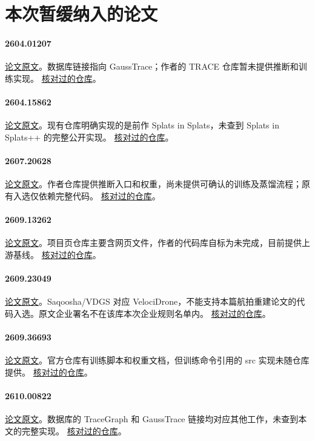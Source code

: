 \section*{本次暂缓纳入的论文}

\paragraph{2604.01207} \href{https://arxiv.org/html/2604.01207}{论文原文}。数据库链接指向 GaussTrace；作者的 TRACE 仓库暂未提供推断和训练实现。 \href{https://github.com/little612pea/Trace}{核对过的仓库}。

\paragraph{2604.15862} \href{https://arxiv.org/html/2604.15862}{论文原文}。现有仓库明确实现的是前作 Splats in Splats，未查到 Splats in Splats++ 的完整公开实现。 \href{https://github.com/insightlab-CG-3DV/splats-in-splats}{核对过的仓库}。

\paragraph{2607.20628} \href{https://arxiv.org/abs/2607.20628}{论文原文}。作者仓库提供推断入口和权重，尚未提供可确认的训练及蒸馏流程；原有入选仅依赖完整代码。 \href{https://github.com/openimaginglab/RealVDeblur}{核对过的仓库}。

\paragraph{2609.13262} \href{https://arxiv.org/html/2609.13262v1}{论文原文}。项目页仓库主要含网页文件，作者的代码库自标为未完成，目前提供上游基线。 \href{https://github.com/vulab-ai/filling-the-unseen-code}{核对过的仓库}。

\paragraph{2609.23049} \href{https://arxiv.org/abs/2609.23049}{论文原文}。Saqoosha/VDGS 对应 VelociDrone，不能支持本篇航拍重建论文的代码入选。原文企业署名不在该库本次企业规则名单内。 \href{https://github.com/saqoosha/vdgs}{核对过的仓库}。

\paragraph{2609.36693} \href{https://arxiv.org/abs/2609.36693}{论文原文}。官方仓库有训练脚本和权重文档，但训练命令引用的 src 实现未随仓库提供。 \href{https://github.com/aesplat/AESplat}{核对过的仓库}。

\paragraph{2610.00822} \href{https://arxiv.org/html/2610.00822v1}{论文原文}。数据库的 TraceGraph 和 GaussTrace 链接均对应其他工作，未查到本文的完整实现。 \href{https://github.com/researchcv/tracegraph}{核对过的仓库}。
